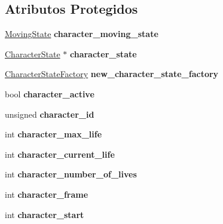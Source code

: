 \subsection*{Atributos Protegidos}
\begin{DoxyCompactItemize}
\item 
\mbox{\label{classCharacter_afebf14960658d88bd70df4f55de3d334}} 
\mbox{\hyperlink{classMovingState}{Moving\+State}} {\bfseries character\+\_\+moving\+\_\+state}
\item 
\mbox{\label{classCharacter_a35427d8eb8464ae90149e31262f4dc57}} 
\mbox{\hyperlink{classCharacterState}{Character\+State}} $\ast$ {\bfseries character\+\_\+state}
\item 
\mbox{\label{classCharacter_aa98c4b7a857fdb408cb790fdc1dd33b7}} 
\mbox{\hyperlink{classCharacterStateFactory}{Character\+State\+Factory}} {\bfseries new\+\_\+character\+\_\+state\+\_\+factory}
\item 
\mbox{\label{classCharacter_acb93cf49560055ead552c5094a54184c}} 
bool {\bfseries character\+\_\+active}
\item 
\mbox{\label{classCharacter_ac967fe6670f51494ed141c54e20b1572}} 
unsigned {\bfseries character\+\_\+id}
\item 
\mbox{\label{classCharacter_a2f4be8102c8557a93b67b8fac9679dd8}} 
int {\bfseries character\+\_\+max\+\_\+life}
\item 
\mbox{\label{classCharacter_a0e29776ad32bfcf2ca55838f00d29933}} 
int {\bfseries character\+\_\+current\+\_\+life}
\item 
\mbox{\label{classCharacter_a46b1ccac564ac16935cb22a82e62bc27}} 
int {\bfseries character\+\_\+number\+\_\+of\+\_\+lives}
\item 
\mbox{\label{classCharacter_adf140a8993f2a10b77ebf3415460f48b}} 
int {\bfseries character\+\_\+frame}
\item 
\mbox{\label{classCharacter_a52bd80f30b5a19bae445d2566819704b}} 
int {\bfseries character\+\_\+start}

\end{DoxyCompactItemize}
